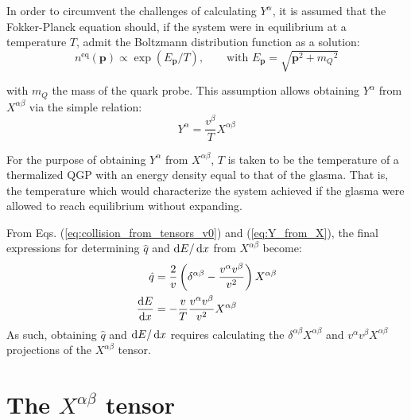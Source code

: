 In order to circumvent the challenges of calculating $Y^\alpha$, it is assumed that the Fokker-Planck equation should, if the system were in equilibrium at a temperature $T$, admit the Boltzmann distribution function as a solution: 
\begin{equation*}
	n^{\text{eq}}(\mathbf{p}) \propto \exp(E_\mathbf{p}/T), \qquad \text{with } E_\mathbf{p} = \sqrt{\mathbf{p}^2 + {m_Q}^2}
\end{equation*}

\noindent with $m_Q$ the mass of the quark probe. This assumption allows obtaining $Y^\alpha$ from $X^{\alpha\beta}$ via the simple relation:
\begin{equation}
	Y^\alpha = \frac{v^\beta}{T} X^{\alpha\beta}
	\label{eq:Y_from_X}
\end{equation}

For the purpose of obtaining $Y^\alpha$ from $X^{\alpha\beta}$, $T$ is taken to be the temperature of a thermalized QGP with an energy density equal to that of the glasma. That is, the temperature which would characterize the system achieved if the glasma were allowed to reach equilibrium without expanding. %

From Eqs. (\ref{eq:collision_from_tensors_v0}) and (\ref{eq:Y_from_X}), the final expressions for determining $\hat{q}$ and $\mathop{}\!\mathrm{d} E / \mathop{}\!\mathrm{d} x$ from $X^{\alpha \beta}$ become:
\begin{subequations}
\begin{align}
	\hat{q} & = \frac{2}{v} \left(\delta^{\alpha \beta} - \frac{v^\alpha v^\beta}{v^2} \right) X^{\alpha\beta} \\	
	\frac{\mathop{}\!\mathrm{d} E}{\mathop{}\!\mathrm{d} x} &= - \frac{v}{T}\frac{v^\alpha v^\beta}{v^2} X^{\alpha \beta} 
\end{align}
\label{eq:collision_from_tensors}
\end{subequations}
As such, obtaining $\hat{q}$ and $\mathop{}\!\mathrm{d} E / \mathop{}\!\mathrm{d} x$ requires calculating the $\delta^{\alpha \beta} X^{\alpha \beta}$ and $v^\alpha v^\beta X^{\alpha \beta}$ projections of the $X^{\alpha \beta}$ tensor.

\section{The $X^{\alpha \beta}$ tensor}

